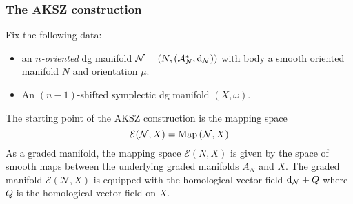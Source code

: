 \documentclass[letterpaper,12pt]{article}
\newcommand{\cE}{\mathcal{E}}
\newcommand{\cN}{\mathcal{N}}
\newcommand{\sA}{\mathcal{A}}
\def\d{{\rm d}}
\theoremstyle{definition}
\theoremstyle{remark}
\theoremstyle{examples}
\def\brian{\textcolor{blue}{BM: }\textcolor{blue}}
\begin{document}
%

\subsubsection{The AKSZ construction}

Fix the following data:
\begin{itemize}
\item an {\em $n$-oriented} dg manifold $\cN = (N, (\sA^*_N, \d_\cN))$ with body a smooth oriented manifold $N$ and orientation $\mu$. 
\item An $(n-1)$-shifted symplectic dg manifold $(X,\omega)$. 
\end{itemize}

The starting point of the AKSZ construction is the mapping space
\begin{equation}\label{eqn: map}
\cE (\cN, X) = {\rm Map}\left(\cN, X\right)
\end{equation}
As a graded manifold, the mapping space $\cE(N,X)$ is given by the space of smooth maps between the underlying graded manifolds $A_N$ and $X$. 
The graded manifold $\cE(\cN, X)$ is equipped with the homological vector field $\d_\cN + Q$ where $Q$ is the homological vector field on $X$. 
\end{document}
